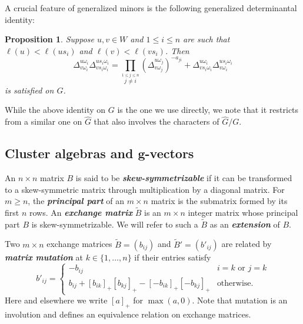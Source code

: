 \documentclass[12pt]{amsart}
\newcommand{\sayDR}[1]{\say[DR]{\color{red}{\bf DR:}\;#1}}
\newcommand{\newword}[1]{\textbf{\emph{#1}}}
\newcommand{\bfg}{\mathbf{g}}
\newtheorem{proposition}[theorem]{Proposition}
\theoremstyle{remark}
\numberwithin{equation}{section}
\numberwithin{figure}{section}
\begin{document}
A crucial feature of generalized minors is the following generalized determinantal identity:

\begin{proposition}\cite{FZ99,Wil13}
  \label{prop:fundid}
  Suppose $u,v \in W$ and $1 \leq i \leq n$ are such that $\ell(u)<\ell(us_i)$ and $\ell(v)<\ell(vs_i)$.
  Then
  \begin{equation}
    \label{eq:fundid}
    \Delta_{v\omega_i}^{u\omega_i} \Delta_{vs_i\omega_i}^{us_i\omega_i}
    =
    \prod_{\stackrel{1\leq j \leq n}{j\neq i}}\left(\Delta_{v\omega_j}^{u\omega_j}\right)^{-a_{ji}}
    +
    \Delta_{vs_i\omega_i}^{u\omega_i} \Delta_{v\omega_i}^{us_i\omega_i}
  \end{equation}
  is satisfied on $G$.%
\end{proposition}

While the above identity on $G$ is the one we use directly, we note that it restricts from a similar one on $\widehat{G}$ that also involves the characters of $\widehat{G}/G$.

\subsection{Cluster algebras and $\bfg$-vectors}
\label{sec:clusteralgebras}
An $n\times n$ matrix $B$ is said to be \newword{skew-symmetrizable} if it can be transformed to a skew-symmetric matrix through multiplication by a diagonal matrix.
For $m \geq n$, the \newword{principal part} of an $m \times n$ matrix is the submatrix formed by its first $n$ rows.
An \newword{exchange matrix} $\widetilde B$ is an $m\times n$ integer matrix whose principal part $B$ is skew-symmetrizable.
We will refer to such a $\widetilde B$ as an \newword{extension} of $B$.

Two $m\times n$ exchange matrices $\widetilde B=(b_{ij})$ and $\widetilde B'=(b'_{ij})$ are related by \newword{matrix mutation} at $k \in \{1,\dotsc,n\}$ if their entries satisfy
\begin{equation}
\label{eq:matrix mutation}
  b'_{ij} = \begin{cases}
  -b_{ij} & i = k \text{ or } j = k\\
  b_{ij} + [b_{ik}]_+ [b_{kj}]_+ - [-b_{ik}]_+ [-b_{kj}]_+ & \text{otherwise.}
  \end{cases}
\end{equation}
Here and elsewhere we write $[a]_+$ for $\max(a,0)$.
Note that mutation is an involution and defines an equivalence relation on exchange matrices.
\end{document}
